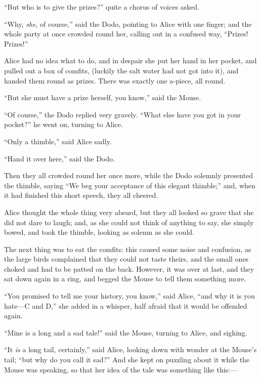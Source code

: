 \documentclass[11pt,openany,oneside]{book}
\begin{document}
“But who is to give the prizes?” quite a chorus of voices asked. 

“Why, {\em she\/}, of course,” said the Dodo, pointing to Alice with one finger; and the whole party at once crowded round her, calling out in a confused way, “Prizes! Prizes!” 

Alice had no idea what to do, and in despair she put her hand in her pocket, and pulled out a box of comfits, (luckily the salt water had not got into it), and handed them round as prizes. There was exactly one a-piece, all round. 

“But she must have a prize herself, you know,” said the Mouse. 

“Of course,” the Dodo replied very gravely. “What else have you got in your pocket?” he went on, turning to Alice. 

“Only a thimble,” said Alice sadly. 

“Hand it over here,” said the Dodo. 

Then they all crowded round her once more, while the Dodo solemnly presented the thimble, saying “We beg your acceptance of this elegant thimble;” and, when it had finished this short speech, they all cheered. 

Alice thought the whole thing very absurd, but they all looked so grave that she did not dare to laugh; and, as she could not think of anything to say, she simply bowed, and took the thimble, looking as solemn as she could. 

The next thing was to eat the comfits: this caused some noise and confusion, as the large birds complained that they could not taste theirs, and the small ones choked and had to be patted on the back. However, it was over at last, and they sat down again in a ring, and begged the Mouse to tell them something more. 

“You promised to tell me your history, you know,” said Alice, “and why it is you hate—C and D,” she added in a whisper, half afraid that it would be offended again. 

“Mine is a long and a sad tale!” said the Mouse, turning to Alice, and sighing. 

“It {\em is\/} a long tail, certainly,” said Alice, looking down with wonder at the Mouse’s tail; “but why do you call it sad?” And she kept on puzzling about it while the Mouse was speaking, so that her idea of the tale was something like this:— 
\end{document}
